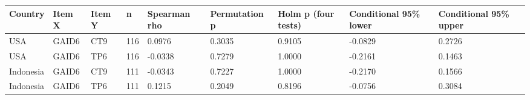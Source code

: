 \begin{tabular}{lllllllll}
\toprule
Country & Item X & Item Y & n & Spearman rho & Permutation p & Holm p (four tests) & Conditional 95\% lower & Conditional 95\% upper \\
\midrule
USA & GAID6 & CT9 & 116 & 0.0976 & 0.3035 & 0.9105 & -0.0829 & 0.2726 \\
USA & GAID6 & TP6 & 116 & -0.0338 & 0.7279 & 1.0000 & -0.2161 & 0.1463 \\
Indonesia & GAID6 & CT9 & 111 & -0.0343 & 0.7227 & 1.0000 & -0.2170 & 0.1566 \\
Indonesia & GAID6 & TP6 & 111 & 0.1215 & 0.2049 & 0.8196 & -0.0756 & 0.3084 \\
\bottomrule
\end{tabular}
